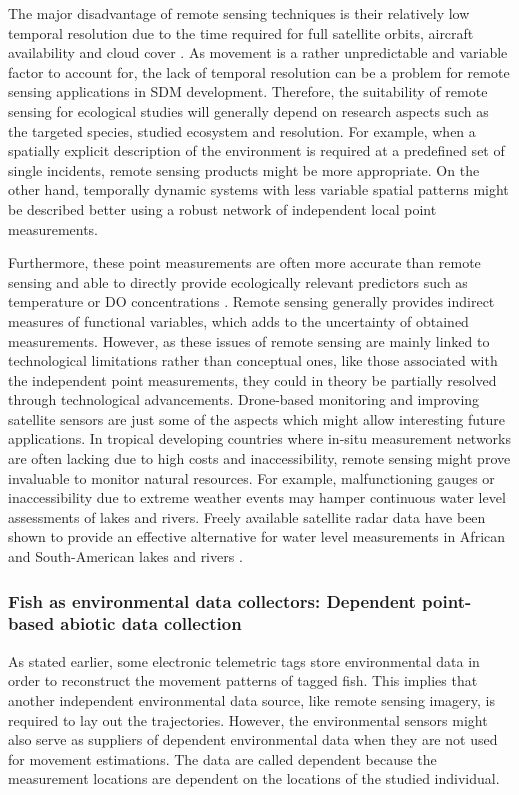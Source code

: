 \documentclass[12pt,authoryear]{elsarticle}
\begin{document}
The major disadvantage of remote sensing techniques is their relatively low temporal resolution due to the time required for full satellite orbits, aircraft availability and cloud cover \citep{Hestir2015,He2015}. As movement is a rather unpredictable and variable factor to account for, the lack of temporal resolution can be a problem for remote sensing applications in SDM development. Therefore, the suitability of remote sensing for ecological studies will generally depend on research aspects such as the targeted species, studied ecosystem and resolution. For example, when a spatially explicit description of the environment is required at a predefined set of single incidents, remote sensing products might be more appropriate. On the other hand, temporally dynamic systems with less variable spatial patterns might be described better using a robust network of independent local point measurements. 

Furthermore, these point measurements are often more accurate than remote sensing and able to directly provide ecologically relevant predictors such as temperature or DO concentrations \citep{Cord2013}. Remote sensing generally provides indirect measures of functional variables, which adds to the uncertainty of obtained measurements. However, as these issues of remote sensing are mainly linked to technological limitations rather than conceptual ones, like those associated with the independent point measurements, they could in theory be partially resolved through technological advancements. Drone-based monitoring and improving satellite sensors are just some of the aspects which might allow interesting future applications. In tropical developing countries where in-situ measurement networks are often lacking due to high costs and inaccessibility, remote sensing might prove invaluable to monitor natural resources. For example, malfunctioning gauges or inaccessibility due to extreme weather events may hamper continuous water level assessments of lakes and rivers. Freely available satellite radar data have been shown to provide an effective alternative for water level measurements in African and South-American lakes and rivers \citep{Munyaneza2009,Benveniste2004}.   

\subsubsection{Fish as environmental data collectors: Dependent point-based abiotic data collection}
\label{AnimalBorne}

As stated earlier, some electronic telemetric tags store environmental data in order to reconstruct the movement patterns of tagged fish. This implies that another independent environmental data source, like remote sensing imagery, is required to lay out the trajectories. However, the environmental sensors might also serve as suppliers of dependent environmental data when they are not used for movement estimations. The data are called dependent because the measurement locations are dependent on the locations of the studied individual.
\end{document}
